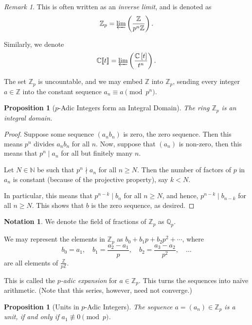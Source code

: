 \documentclass{article}
\newtheorem{proposition}[theorem]{Proposition}
\theoremstyle{definition}
\newtheorem{notation}[theorem]{Notation}
\theoremstyle{remark}
\newtheorem{remark}[theorem]{Remark}
\newcommand{\pqty}[1]{\left(#1\right)}
\newcommand{\bqty}[1]{\left[#1\right]}
\newcommand{\bbrac}[1]{[\![#1]\!]}
\newcommand{\flatfrac}[2]{\frac{#1}{#2}}
\newcommand{\divides}{\mid}
\newcommand{\notdivides}{\nmid}
\newcommand{\nequiv}{\not\equiv}
\newcommand{\ZZ}{\mathbb{Z}}
\newcommand{\QQ}{\mathbb{Q}}
\newcommand{\CC}{\mathbb{C}}
\newcommand{\NN}{\mathbb{N}}
\begin{document}
\begin{remark}
    This is often written as an \emph{inverse limit}, and is denoted as
    \[
        \ZZ_p = \varprojlim \pqty{\flatfrac{\ZZ}{p^n \ZZ}}.
    \]

    Similarly, we denote
    \[
        \CC\bbrac{t} = \varprojlim \pqty{\flatfrac{\CC\bqty{t}}{t^n}}.
    \]
\end{remark}

The set \(\ZZ_p\) is uncountable, and we may embed \(\ZZ\) into \(\ZZ_p\), sending every integer \(a \in \ZZ\) into the constant sequence \(a_n \equiv a \pmod{p^n}\).

\begin{proposition}[\(p\)-Adic Integers form an Integral Domain]
    \label{prop:p-adic-integral-domain}%
    The ring \(\ZZ_p\) is an integral domain.
\end{proposition}

\begin{proof}
    Suppose some sequence \(\pqty{a_n b_n}\) is zero, the zero sequence. Then this means \(p^n\) divides \(a_n b_n\) for all \(n\). Now, suppose that \(\pqty{a_n}\) is non-zero, then this means that \(p^n \divides a_n\) for all but finitely many \(n\).

    Let \(N \in \NN\) be such that \(p^n \notdivides a_n\) for all \(n \geq N\). Then the number of factors of \(p\) in \(a_n\) is constant (because of the projective property), say \(k < N\).
    
    In particular, this means that \(p^{n - k} \divides b_n\) for all \(n \geq N\), and hence, \(p^{n - k} \divides b_{n - k}\) for all \(n \geq N\). This shows that \(b\) is the zero sequence, as desired.
\end{proof}

\begin{notation}
    We denote the field of fractions of \(\ZZ_p\) as \(\QQ_p\).
\end{notation}

We may represent the elements in \(\ZZ_p\) as \(b_0 + b_1 p + b_2 p^2 + \cdots\), where
\[
    b_0 = a_1, \quad b_1 = \frac{a_2 - a_1}{p}, \quad  b_2 = \frac{a_3 - a_2}{p^2}, \quad \ldots
\]
are all elements of \(\flatfrac{\ZZ}{p \ZZ}\).

This is called the \emph{\(p\)-adic expansion} for \(a \in \ZZ_p\). This turns the sequences into na\"ive arithmetic. (Note that this series, however, need not converge.)

\begin{proposition}[Units in \(p\)-Adic Integers]
    \label{prop:units-p-adic}%
    The sequence \(a = \pqty{a_n} \in \ZZ_p\) is a unit, if and only if \(a_1 \nequiv 0 \pmod{p}\).
\end{proposition}
\end{document}
